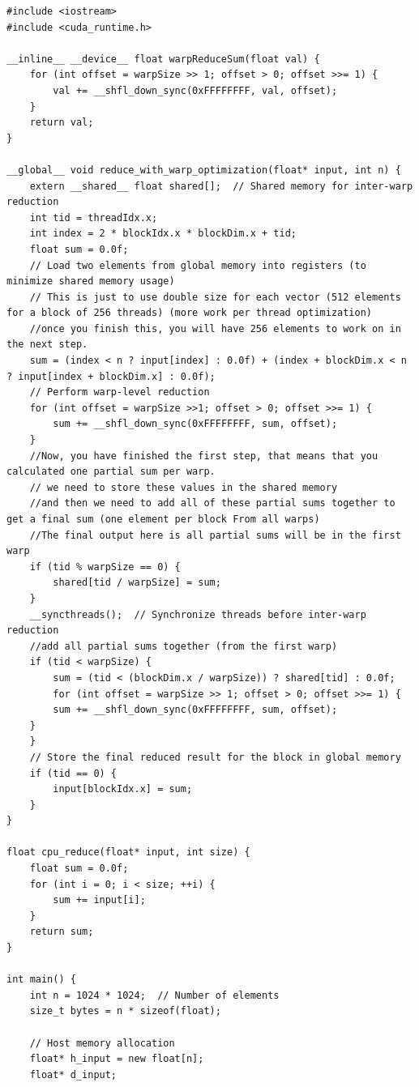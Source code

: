 \begin{lstlisting}[caption={Shuffle-based Reduction Kernel}]
#include <iostream>
#include <cuda_runtime.h>

__inline__ __device__ float warpReduceSum(float val) {
    for (int offset = warpSize >> 1; offset > 0; offset >>= 1) {
        val += __shfl_down_sync(0xFFFFFFFF, val, offset);
    }
    return val;
}

__global__ void reduce_with_warp_optimization(float* input, int n) {
    extern __shared__ float shared[];  // Shared memory for inter-warp reduction
    int tid = threadIdx.x;
    int index = 2 * blockIdx.x * blockDim.x + tid;
    float sum = 0.0f;
    // Load two elements from global memory into registers (to minimize shared memory usage)
    // This is just to use double size for each vector (512 elements for a block of 256 threads) (more work per thread optimization)
    //once you finish this, you will have 256 elements to work on in the next step.
    sum = (index < n ? input[index] : 0.0f) + (index + blockDim.x < n ? input[index + blockDim.x] : 0.0f);
    // Perform warp-level reduction
    for (int offset = warpSize >>1; offset > 0; offset >>= 1) {
        sum += __shfl_down_sync(0xFFFFFFFF, sum, offset);
    }
    //Now, you have finished the first step, that means that you calculated one partial sum per warp.
    // we need to store these values in the shared memory
    //and then we need to add all of these partial sums together to get a final sum (one element per block From all warps)
    //The final output here is all partial sums will be in the first warp
    if (tid % warpSize == 0) {
        shared[tid / warpSize] = sum;
    }
    __syncthreads();  // Synchronize threads before inter-warp reduction
    //add all partial sums together (from the first warp)
    if (tid < warpSize) {
        sum = (tid < (blockDim.x / warpSize)) ? shared[tid] : 0.0f;
        for (int offset = warpSize >> 1; offset > 0; offset >>= 1) {
        sum += __shfl_down_sync(0xFFFFFFFF, sum, offset);
    }
    }
    // Store the final reduced result for the block in global memory
    if (tid == 0) {
        input[blockIdx.x] = sum;
    }
}

float cpu_reduce(float* input, int size) {
    float sum = 0.0f;
    for (int i = 0; i < size; ++i) {
        sum += input[i];
    }
    return sum;
}

int main() {
    int n = 1024 * 1024;  // Number of elements
    size_t bytes = n * sizeof(float);

    // Host memory allocation
    float* h_input = new float[n];
    float* d_input;


\end{lstlisting}
